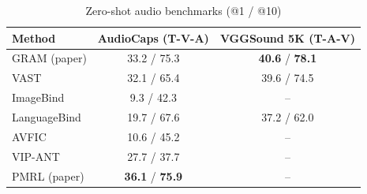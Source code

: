 \begin{table}[t]
\centering
\caption{Zero-shot audio benchmarks (@1 / @10)}
\label{tab:zeroshot_audio}
\small
\begin{tabular}{lcc}
\toprule
Method & AudioCaps (T-V-A) & VGGSound 5K (T-A-V) \\
\midrule
GRAM (paper) & 33.2 / 75.3 & \textbf{40.6} / \textbf{78.1} \\
VAST & 32.1 / 65.4 & 39.6 / 74.5 \\
ImageBind & 9.3 / 42.3 & -- \\
LanguageBind & 19.7 / 67.6 & 37.2 / 62.0 \\
AVFIC & 10.6 / 45.2 & -- \\
VIP-ANT & 27.7 / 37.7 & -- \\
PMRL (paper) & \textbf{36.1} / \textbf{75.9} & -- \\
\bottomrule
\end{tabular}
\end{table}
